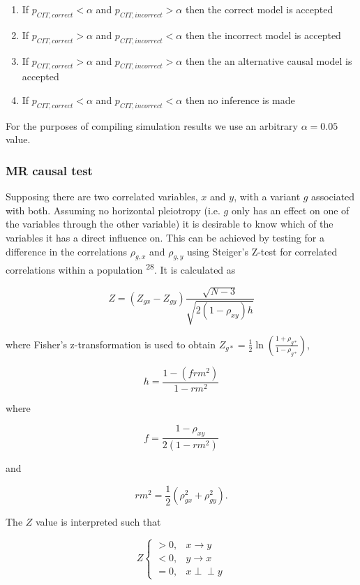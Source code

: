 \documentclass[]{article}
\begin{document}
\begin{enumerate}
\def\labelenumi{\arabic{enumi}.}
\itemsep1pt\parskip0pt
\item
  If $p_{CIT,correct} < \alpha$ and $p_{CIT,incorrect} > \alpha$ then
  the correct model is accepted
\item
  If $p_{CIT,correct} > \alpha$ and $p_{CIT,incorrect} < \alpha$ then
  the incorrect model is accepted
\item
  If $p_{CIT,correct} > \alpha$ and $p_{CIT,incorrect} > \alpha$ then
  the an alternative causal model is accepted
\item
  If $p_{CIT,correct} < \alpha$ and $p_{CIT,incorrect} < \alpha$ then no
  inference is made
\end{enumerate}

For the purposes of compiling simulation results we use an arbitrary
$\alpha = 0.05$ value.

\subsubsection{MR causal test}\label{mr-causal-test}

Supposing there are two correlated variables, $x$ and $y$, with a
variant $g$ associated with both. Assuming no horizontal pleiotropy
(i.e. $g$ only has an effect on one of the variables through the other
variable) it is desirable to know which of the variables it has a direct
influence on. This can be achieved by testing for a difference in the
correlations $\rho_{g, x}$ and $\rho_{g, y}$ using Steiger's Z-test for
correlated correlations within a population \textsuperscript{28}. It is
calculated as

\[
Z = (Z_{gx} - Z_{gy}) \frac{\sqrt{N-3}}{\sqrt{2(1-\rho_{xy})h}}
\]

where Fisher's z-transformation is used to obtain
$Z_{g*} = \frac{1}{2} \ln \left ( \frac{1+\rho_{g*}}{1-\rho_{g*}} \right )$,

\[
h = \frac{1 - (frm^2)} {1 - rm^2}
\]

where

\[
f = \frac{1 - \rho_{xy}}{2(1 - rm^2)}
\]

and

\[
rm^2 = \frac{1}{2}(\rho_{gx}^2 + \rho_{gy}^2).
\]

The $Z$ value is interpreted such that

\[
Z \left\{
\begin{array}{ll}
> 0, & x \to y\\
< 0, & y \to x\\
= 0, & x \perp\!\!\!\perp y 
\end{array} \right.
\]
\end{document}
